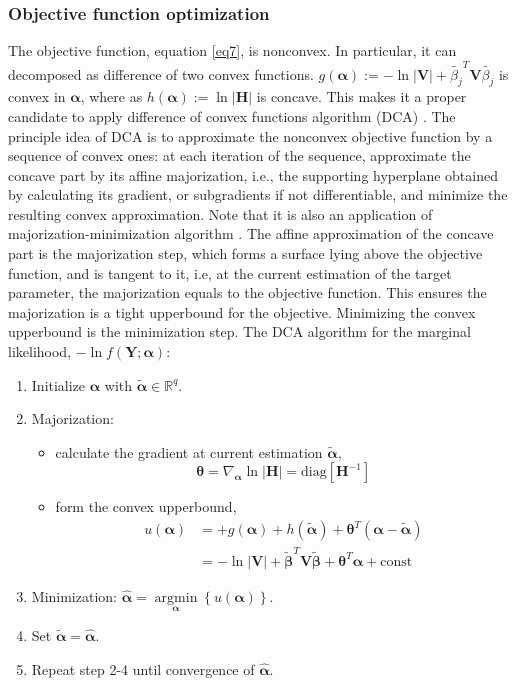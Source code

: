 \documentclass[12pt]{article}
\DeclareMathOperator*{\argmin}{argmin}
\begin{document}
\subsubsection{Objective function optimization} \label{DCA}
The objective function, equation \eqref{eq7}, is nonconvex. In particular, it can decomposed as difference of two convex functions. $g(\bm{\alpha}):=-\ln{|\bm{V}|} + \widetilde{\beta_j}^T\bm{V}\widetilde{\beta_j}$ is convex in $\bm{\alpha}$, where as $h(\bm{\alpha}):=\ln{|\bm{H}|}$ is concave. This makes it a proper candidate to apply difference of convex functions algorithm (DCA) \citep{le2015dc}. The principle idea of DCA is to approximate the nonconvex objective function by a sequence of convex ones: at each iteration of the sequence, approximate the concave part by its affine majorization, i.e., the supporting hyperplane obtained by calculating its gradient, or subgradients if not differentiable, and minimize the resulting convex approximation. Note that it is also an application of majorization-minimization algorithm \citep{hunter2004tutorial}. The affine approximation of the concave part is the majorization step, which forms a surface lying above the objective function, and is tangent to it, i.e, at the current estimation of the target parameter, the majorization equals to the objective function. This ensures the majorization is a tight upperbound for the objective. Minimizing the convex upperbound is the minimization step. The DCA algorithm for the marginal likelihood, $-\ln{f(\bm{Y};\bm{\alpha})}$:
\begin{enumerate}
    \item Initialize $\bm{\alpha}$ with $\widetilde{\bm{\alpha}} \in \mathbb{R}^q$.
    \item Majorization: 
    \begin{itemize}
        \item calculate the gradient at current estimation $\widetilde{\bm{\alpha}}$,
    $$\bm{\theta}= \nabla_{\bm{\alpha}} \ln{|\bm{H}|} = \text{diag}[\bm{H}^{-1}]$$ 
        \item form the convex upperbound,
        \begin{align*}
        u(\bm{\alpha})&=+g(\bm{\alpha})+ h(\widetilde{\bm{\alpha}}) + \bm{\theta}^T(\bm{\alpha}-\widetilde{\bm{\alpha}}) \\
        &=-\ln{|\bm{V}|} + \widetilde{\bm{\beta}}^T\bm{V}\widetilde{\bm{\beta}}+\bm{\theta}^T\bm{\alpha}+\text{const}
        \end{align*}
    \end{itemize}
    \item Minimization: $\hat{\bm{\alpha}}=\underset{\bm{\alpha}}{\operatorname{\argmin}} \left\{u(\bm{\alpha})\right\}$.
    \item Set $\widetilde{\bm{\alpha}} = \hat{\bm{\alpha}}$.
    \item Repeat step 2-4 until convergence of $\hat{\bm{\alpha}}$.
\end{enumerate}
\end{document}
